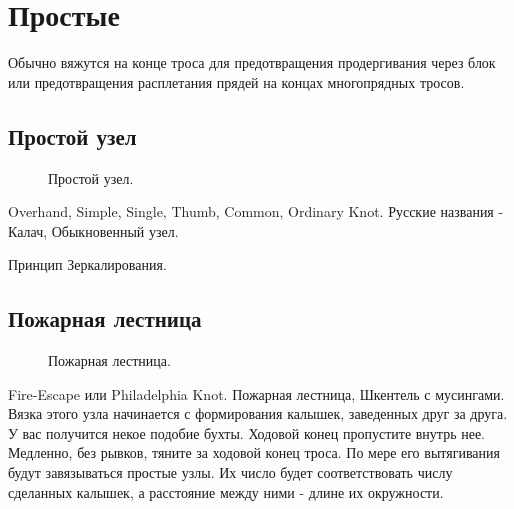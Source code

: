 \section{Простые}

Обычно вяжутся на конце троса для предотвращения продергивания через блок или предотвращения расплетания прядей на концах многопрядных тросов.

\subsection{Простой узел}

\begin{figure}[H]\centering
	\subfloat[Левый]{\label{ris:Single_Knot_left}
	\tcbox[enhanced jigsaw,colframe=black,opacityframe=0.5,opacityback=0.5]
		{\centering
			}
		}
\hfil
	\subfloat[Правый]{\label{ris:Single_Knot_right}
	\tcbox[enhanced jigsaw,colframe=black,opacityframe=0.5,opacityback=0.5]
		{\centering
			}
		}
	\caption{Простой узел.}\label{ris:Single_Knot}
\end{figure}

Overhand, Simple, Single, Thumb, Common, Ordinary Knot. Русские названия - Калач, Обыкновенный узел.

Принцип Зеркалирования.

\subsection{Пожарная лестница}

\begin{figure}[H]\centering
	\subfloat[Завязывание]{\label{ris:Fire-Escape_1}
	\tcbox[enhanced jigsaw,colframe=black,opacityframe=0.5,opacityback=0.5]
		{\centering
			}
		}
\end{figure}
\begin{figure}[H]\centering
	\subfloat[Результат]{\label{ris:Fire-Escape_2}
	\tcbox[enhanced jigsaw,colframe=black,opacityframe=0.5,opacityback=0.5]
		{\centering
			}
		}
	\caption{Пожарная лестница.}\label{ris:Fire-Escape}
\end{figure}

Fire-Escape или Philadelphia Knot. Пожарная лестница, Шкентель с мусингами. Вязка этого узла начинается с формирования калышек, заведенных друг за друга. У вас получится некое подобие бухты. Ходовой конец пропустите внутрь нее. Медленно, без рывков, тяните за ходовой конец троса. По мере его вытягивания будут завязываться простые узлы. Их число будет соответствовать числу сделанных калышек, а расстояние между ними - длине их окружности.

